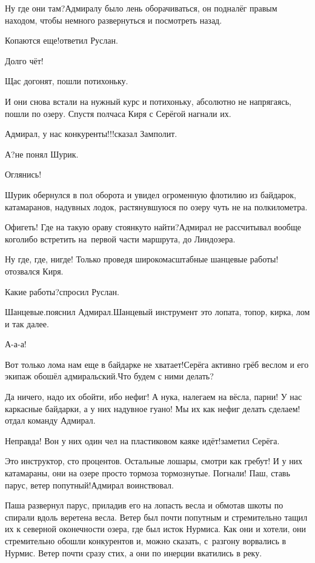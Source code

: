 \diagdash Ну где они там?\mdash Адмиралу было лень оборачиваться, он подналёг правым находом, чтобы немного развернуться и посмотреть назад.

\diagdash Копаются еще!\mdash ответил Руслан.

\diagdash Долго чёт!

\diagdash Щас догонят, пошли потихоньку.

И они снова встали на нужный курс и потихоньку, абсолютно не напрягаясь, пошли по озеру. Спустя полчаса Киря с Серёгой нагнали их.

\diagdash Адмирал, у нас конкуренты!!!\mdash сказал Замполит.

\diagdash А?\mdash не понял Шурик.

\diagdash Оглянись!

Шурик обернулся в пол оборота и увидел огроменную флотилию из байдарок, катамаранов, надувных лодок, растянувшуюся по озеру чуть не на полкилометра. 

\diagdash Офигеть! Где на такую ораву стоянку\sdash то найти?\mdash Адмирал не рассчитывал вообще кого\sdash либо встретить на~первой части маршрута, до Линдозера.

\diagdash Ну где, где, нигде! Только проведя широкомасштабные шанцевые работы!\mdash отозвался Киря.

\diagdash Какие работы?\mdash спросил Руслан.

\diagdash Шанцевые.\mdash пояснил Адмирал.\mdash Шанцевый инструмент это лопата, топор, кирка, лом и так далее.

\diagdash А-а-а!

\diagdash Вот только лома нам еще в байдарке не хватает!\mdash Серёга активно грёб веслом и его экипаж обошёл адмиральский.\mdash Что будем с ними делать?

\diagdash Да ничего, надо их обойти, ибо нефиг! А ну\sdash ка, налегаем на вёсла, парни! У нас каркасные байдарки, а у них надувное гуано! Мы их как нефиг делать сделаем!\mdash отдал команду Адмирал.

\diagdash Неправда! Вон у них один чел на пластиковом каяке идёт!\mdash заметил Серёга.

\diagdash Это инструктор, сто процентов. Остальные лошары, смотри как гребут! И у них катамараны, они на озере просто тормоза тормознутые. Погнали! Паш, ставь парус, ветер попутный!\mdash Адмирал воинствовал.

Паша развернул парус, приладив его на лопасть весла и обмотав шкоты по спирали вдоль веретена весла. Ветер был почти попутным и стремительно тащил их к северной оконечности озера, где был исток Нурмиса. Как они и хотели, они стремительно обошли конкурентов и, можно сказать, с~разгону ворвались в Нурмис. Ветер почти сразу стих, а они по инерции вкатились в реку.

